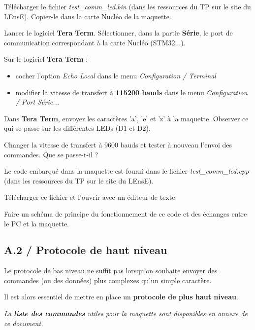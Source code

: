 \documentclass[a4paper,11pt,titlepage]{article} %
\begin{document}
\Manip Télécharger le fichier \textsl{test\_comm\_led.bin} (dans les ressources du TP sur le site du LEnsE). Copier-le dans la carte Nucléo de la maquette.

\medskip

\Manip Lancer le logiciel \textbf{Tera Term}. Sélectionner, dans la partie \textbf{Série}, le port de communication correspondant à la carte Nucléo (STM32...).

\Manip Sur le logiciel \textbf{Tera Term} :

\begin{itemize}
	\item cocher l'option \textsl{Echo Local} dans le menu \textsl{Configuration / Terminal}
	\item modifier la vitesse de transfert à \textbf{115200 bauds} dans le menu \textsl{Configuration / Port Série...} 
\end{itemize}

\Manip Dans \textbf{Tera Term}, envoyer les caractères 'a', 'e' et 'z' à la maquette. Observer ce qui se passe sur les différentes LEDs (D1 et D2).

\medskip

\Manip Changer la vitesse de transfert à 9600 bauds et tester à nouveau l'envoi des commandes. Que se passe-t-il ?

\medskip

Le code embarqué dans la maquette est fourni dans le fichier \textsl{test\_comm\_led.cpp} (dans les ressources du TP sur le site du LEnsE). 

\Manip Télécharger ce fichier et l'ouvrir avec un éditeur de texte.

\Quest Faire un schéma de principe du fonctionnement de ce code et des échanges entre le PC et la maquette.


\subsection{A.2 / Protocole de haut niveau}

Le protocole de bas niveau ne suffit pas lorsqu'on souhaite envoyer des commandes (ou des données) plus complexes qu'un simple caractère.

Il est alors essentiel de mettre en place un \textbf{protocole de plus haut niveau}.

\medskip

\textit{La \textbf{liste des commandes} utiles pour la maquette sont disponibles en annexe de ce document.}
\end{document}
